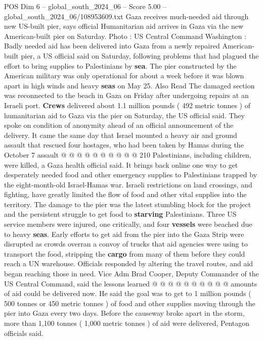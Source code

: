 \begin{textsample}{POS Dim 6 – global\_south\_2024\_06 – Score 5.00 – global\_south\_2024\_06/108953609.txt}  \label{ex:f6_pos_156}
Gaza receives much-needed aid through new US-built pier, says official Humanitarian aid arrives in Gaza via the new American-built pier on Saturday.
Photo : US Central Command Washington : Badly needed aid has been delivered into Gaza from a newly repaired American-built pier, a US official said on Saturday, following problems that had plagued the effort to bring supplies to Palestinians by \textbf{sea}.
The pier constructed by the American military was only operational for about a week before it was blown apart in high winds and heavy \textbf{seas} on May 25.
Also Read The damaged section was reconnected to the beach in Gaza on Friday after undergoing repairs at an Israeli port. \textbf{Crews} delivered about 1.1 million pounds ( 492 metric tonnes ) of humanitarian aid to Gaza via the pier on Saturday, the US official said.
They spoke on condition of anonymity ahead of an official announcement of the delivery.
It came the same day that Israel mounted a heavy air and ground assault that rescued four hostages, who had been taken by Hamas during the October 7 assault @ @ @ @ @ @ @ @ @ @ 210 Palestinians, including children, were killed, a Gaza health official said.
It brings back online one way to get desperately needed food and other emergency supplies to Palestinians trapped by the eight-month-old Israel-Hamas war.
Israeli restrictions on land crossings, and fighting, have greatly limited the flow of food and other vital supplies into the territory.
The damage to the pier was the latest stumbling block for the project and the persistent struggle to get food to \textbf{starving} Palestinians.
Three US service members were injured, one critically, and four \textbf{vessels} were beached due to heavy \textbf{seas}.
Early efforts to get aid from the pier into the Gaza Strip were disrupted as crowds overran a convoy of trucks that aid agencies were using to transport the food, stripping the \textbf{cargo} from many of them before they could reach a UN warehouse.
Officials responded by altering the travel routes, and aid began reaching those in need.
Vice Adm Brad Cooper, Deputy Commander of the US Central Command, said the lessons learned @ @ @ @ @ @ @ @ @ @ amounts of aid could be delivered now.
He said the goal was to get to 1 million pounds ( 500 tonnes or 450 metric tonnes ) of food and other supplies moving through the pier into Gaza every two days.
Before the causeway broke apart in the storm, more than 1,100 tonnes ( 1,000 metric tonnes ) of aid were delivered, Pentagon officials said.

\end{textsample}
